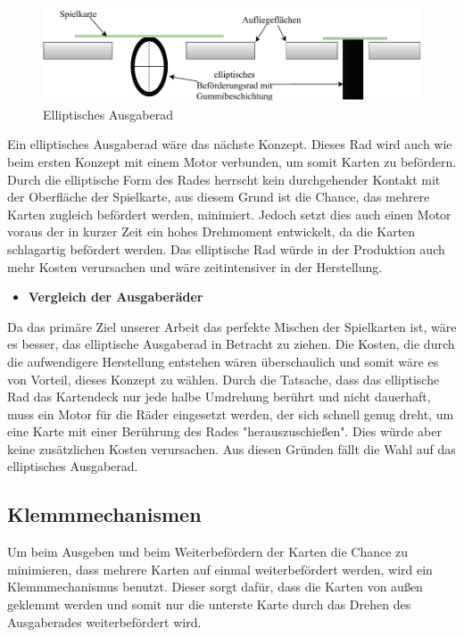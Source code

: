 \begin{figure}[H]
    \centering
    \includegraphics[scale=0.9,page=1]{fig/mech/ElliptischesAusgaberad}
    \caption{Elliptisches Ausgaberad}
\end{figure}


Ein elliptisches Ausgaberad wäre das nächste Konzept.
Dieses Rad wird auch wie beim ersten Konzept mit einem Motor verbunden, um somit Karten zu befördern.
Durch die elliptische Form des Rades herrscht kein durchgehender Kontakt mit der Oberfläche der Spielkarte, aus diesem Grund ist die Chance, das mehrere
Karten zugleich befördert werden, minimiert.
Jedoch setzt dies auch einen Motor voraus der in kurzer Zeit ein hohes Drehmoment entwickelt, da die
Karten schlagartig befördert werden.
Das elliptische Rad würde in der Produktion auch mehr Kosten verursachen und wäre zeitintensiver in der Herstellung. \\

\begin{itemize}
    \item \textbf{Vergleich der Ausgaberäder}
\end{itemize}

Da das primäre Ziel unserer Arbeit das perfekte Mischen der Spielkarten ist, wäre es besser, das elliptische Ausgaberad in Betracht zu ziehen.
Die Kosten, die durch die aufwendigere Herstellung entstehen wären überschaulich und somit wäre es von Vorteil, dieses Konzept zu wählen.
Durch die Tatsache, dass das elliptische Rad das Kartendeck nur jede halbe Umdrehung berührt und nicht dauerhaft, muss ein Motor für die Räder eingesetzt werden, der sich schnell genug dreht, um eine Karte mit einer Berührung
des Rades "herauszuschießen".
Dies würde aber keine zusätzlichen Kosten verursachen.
Aus diesen Gründen fällt die Wahl auf das elliptisches Ausgaberad. \\

\subsection{Klemmmechanismen}
Um beim Ausgeben und beim Weiterbefördern der Karten die Chance zu minimieren, dass mehrere Karten auf einmal weiterbefördert werden, wird ein
Klemmmechanismus benutzt.
Dieser sorgt dafür, dass die Karten von außen geklemmt werden und somit nur die unterste Karte durch das Drehen des
Ausgaberades weiterbefördert wird.

